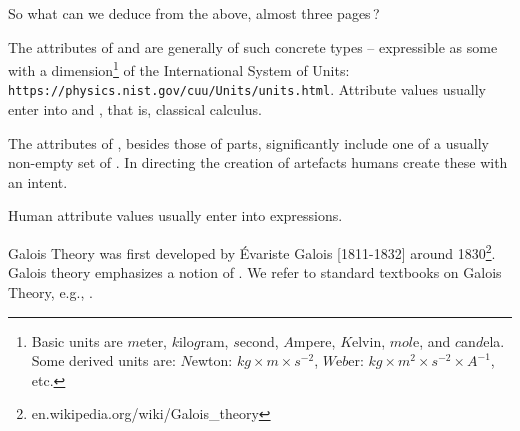 \begynd
\pind So what can we deduce from the above, almost three 
      pages\,?

\pind The attributes of  and  
\begynd
\pind are generally of such concrete types --
\pind expressible as some   with a dimension\footnote{\LLLL
  Basic units are $m$eter, $k$ilo$g$ram, $s$econd, $A$mpere, $K$elvin,
$mol$e, and $c$an$d$ela. Some derived units are: \textsf{$N$ewton:
$kg{\times}m{\times}s^{-2}$, $W$e$b$er:
$kg\times{m}^2\times{s}^{-2}\times{A}^{-1}$}, etc.} of 
\pind the \textsf{International System of Units:}
\pind
{\texttt{https://\-physics.\-nist.\-gov/\-cuu/\-U\-nits/\-u\-nits.\-html}}. 
\afslut
\pind Attribute values usually enter into \nyl {} and
, 
\pind that is, classical calculus.
\afslut
\mnewfoil

\begynd
\pind The attributes of , besides those of parts,
\begynd
\pind significantly include\ysfchg{ } one of a \nyl  usually non-empty set of
. 
\begynd
\pind In directing the creation of artefacts
\pind humans create these with an intent.
\afslut
\afslut
\afslut
\mnewfoil

\vspace*{2mm}
\HHHH\rm
\noindent
\begynd
\pind  Human attribute values usually enter into \nyl  {}
expressions.     
\afslut




\label{kap4-Galois Connections}
%

\begynd
\pind Galois Theory was first developed by {\'E}variste Galois
      [1811-1832] around 1830\footnote{en.wikipedia.org/wiki/Galois\_theory}.
\pind Galois theory emphasizes a notion of .
\pind We refer to standard textbooks on Galois Theory, e.g., \cite[2009]{GaloisTheory2009}.
\afslut

\label{Galois Theory A Primer}\LLLL

